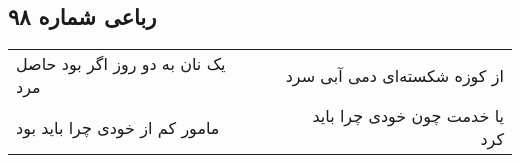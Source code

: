 \begin{center}
\section*{رباعی شماره ۹۸}
\label{sec:sh098}
\begin{longtable}{l p{0.5cm} r}
یک نان به دو روز اگر بود حاصل مرد
&&
از کوزه شکسته‌ای دمی آبی سرد
\\
مامور کم از خودی چرا باید بود
&&
یا خدمت چون خودی چرا باید کرد
\\
\end{longtable}
\end{center}
